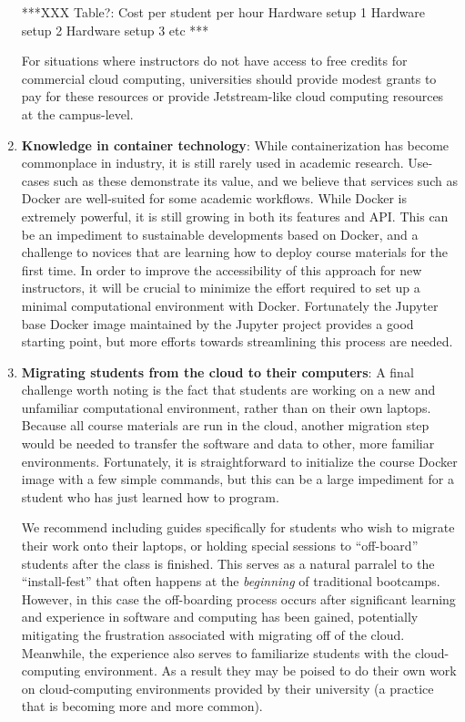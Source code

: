 \begin{enumerate}
***XXX
Table?:
                    Cost per student per hour
Hardware setup 1
Hardware setup 2
Hardware setup 3
etc
***

For situations where instructors do not have access to free credits for
commercial cloud computing, universities should provide modest grants to pay for
these resources or provide Jetstream-like cloud computing resources at the
campus-level.

\item {\bf Knowledge in container technology}: While containerization has become
commonplace in industry, it is still rarely used in academic research. Use-cases
such as these demonstrate its value, and we believe that services such as Docker
are well-suited for some academic workflows. While Docker is extremely powerful,
it is still growing in both its features and API. This can be an impediment to
sustainable developments based on Docker, and a challenge to novices that are
learning how to deploy course materials for the first time. In order to improve
the accessibility of this approach for new instructors, it will be crucial to
minimize the effort required to set up a minimal computational environment with
Docker. Fortunately the Jupyter base Docker image maintained by the Jupyter
project provides a good starting point, but more efforts towards streamlining
this process are needed.

\item {\bf Migrating students from the cloud to their computers}: A final
challenge worth noting is the fact that students are working on a new and
unfamiliar computational environment, rather than on their own laptops. Because
all course materials are run in the cloud, another migration step would be
needed to transfer the software and data to other, more familiar environments.
Fortunately, it is straightforward to initialize the course Docker image with a
few simple commands, but this can be a large impediment for a student who has
just learned how to program.

We recommend including guides specifically for
students who wish to migrate their work onto their laptops, or holding special
sessions to ``off-board'' students after the class is finished. This serves as a
natural parralel to the ``install-fest'' that often happens at the
\emph{beginning} of traditional bootcamps. However, in this case the
off-boarding process occurs after significant learning and experience in
software and computing has been gained, potentially mitigating the frustration
associated with migrating off of the cloud. Meanwhile, the experience also
serves to familiarize students with the cloud-computing environment. As a result
they may be poised to do their own work on cloud-computing environments
provided by their university (a practice that is becoming more and more common).

\end{enumerate}

